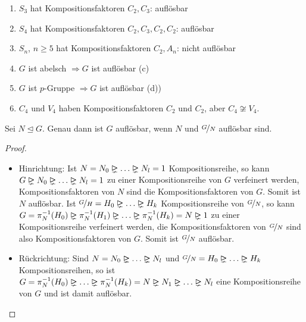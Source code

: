 \begin{example}
	\begin{enumerate}[label=(\alph*)]
		\item $S_3$ hat Kompositionsfaktoren $C_2, C_3$: auflösbar
		\item $S_4$ hat Kompositionsfaktoren $C_2,C_3,C_2,C_2$: auflösbar
		\item $S_n$, $n \geq 5$ hat Kompositionsfaktoren $C_2, A_n$: nicht auflösbar
		\item $G$ ist abelsch $\Longrightarrow G$ ist auflösbar (c)
		\item $G$ ist $p$-Gruppe $\Longrightarrow G$ ist auflösbar (d))
		\item $C_4 \text{ und } V_4$ haben Kompositionsfaktoren $C_2$ und $C_2$, aber $C_4 \not\cong V_4$.
	\end{enumerate}
\end{example}

\begin{lemma}
	Sei $N\unlhd G$. Genau dann ist $G$ auflösbar, wenn $N$ und $\nicefrac{G}{N}$ auflösbar sind.
\end{lemma}
\begin{proof}
	\begin{itemize}
		\item Hinrichtung: Ist $N = N_0 \properidealright \dots \properidealright N_l = 1$ Kompositionsreihe, so kann $G \properidealright N_0 \properidealright \dots \properidealright N_l = 1$ zu einer Kompositionsreihe von $G$ verfeinert werden, Kompositionsfaktoren von $N$ sind die Kompositionsfaktoren von $G$. Somit ist $N$ auflösbar. Ist $\lnkset{G}{H} = H_0 \properidealright \dots \properidealright H_k$ Kompositionsreihe von $\nicefrac{G}{N}$, so kann $G = \pi^{-1}_{N}(H_0) \properidealright \pi^{-1}_{N}(H_1) \properidealright \dots \properidealright \pi^{-1}_{N}(H_k) = N \properidealright 1$ zu einer Kompositionsreihe verfeinert werden, die Kompositionsfaktoren von $\nicefrac{G}{N}$ sind also Kompositionsfaktoren von $G$. Somit ist $\nicefrac{G}{N}$ auflösbar.
		\item Rückrichtung: Sind $N = N_0 \properidealright \dots \properidealright N_l$ und $\lnkset{G}{N}=H_0 \properidealright \dots \properidealright H_k$ Kompositionsreihen, so ist $G = \pi^{-1}_{N}(H_0) \properidealright \dots \properidealright \pi^{-1}_{N}(H_k) = N \properidealright N_1 \properidealright \dots \properidealright N_l$ eine Kompositionsreihe von $G$ und ist damit auflösbar.
	\end{itemize}
\end{proof}

